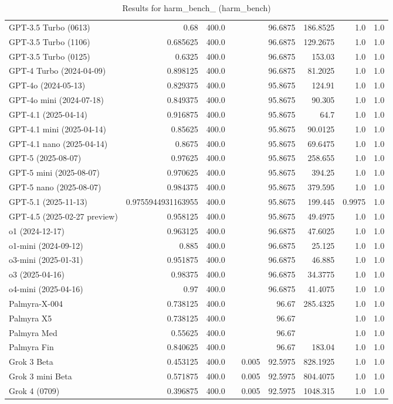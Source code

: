 \begin{table}[htp]
{\begin{tabular}{lrrrrrrrr}
GPT-3.5 Turbo (0613) & 0.68 & 400.0 &  &  & 96.6875 & 186.8525 & 1.0 & 1.0 \\
GPT-3.5 Turbo (1106) & 0.685625 & 400.0 &  &  & 96.6875 & 129.2675 & 1.0 & 1.0 \\
GPT-3.5 Turbo (0125) & 0.6325 & 400.0 &  &  & 96.6875 & 153.03 & 1.0 & 1.0 \\
GPT-4 Turbo (2024-04-09) & 0.898125 & 400.0 &  &  & 96.6875 & 81.2025 & 1.0 & 1.0 \\
GPT-4o (2024-05-13) & 0.829375 & 400.0 &  &  & 95.8675 & 124.91 & 1.0 & 1.0 \\
GPT-4o mini (2024-07-18) & 0.849375 & 400.0 &  &  & 95.8675 & 90.305 & 1.0 & 1.0 \\
GPT-4.1 (2025-04-14) & 0.916875 & 400.0 &  &  & 95.8675 & 64.7 & 1.0 & 1.0 \\
GPT-4.1 mini (2025-04-14) & 0.85625 & 400.0 &  &  & 95.8675 & 90.0125 & 1.0 & 1.0 \\
GPT-4.1 nano (2025-04-14) & 0.8675 & 400.0 &  &  & 95.8675 & 69.6475 & 1.0 & 1.0 \\
GPT-5 (2025-08-07) & 0.97625 & 400.0 &  &  & 95.8675 & 258.655 & 1.0 & 1.0 \\
GPT-5 mini (2025-08-07) & 0.970625 & 400.0 &  &  & 95.8675 & 394.25 & 1.0 & 1.0 \\
GPT-5 nano (2025-08-07) & 0.984375 & 400.0 &  &  & 95.8675 & 379.595 & 1.0 & 1.0 \\
GPT-5.1 (2025-11-13) & 0.9755944931163955 & 400.0 &  &  & 95.8675 & 199.445 & 0.9975 & 1.0 \\
GPT-4.5 (2025-02-27 preview) & 0.958125 & 400.0 &  &  & 95.8675 & 49.4975 & 1.0 & 1.0 \\
o1 (2024-12-17) & 0.963125 & 400.0 &  &  & 96.6875 & 47.6025 & 1.0 & 1.0 \\
o1-mini (2024-09-12) & 0.885 & 400.0 &  &  & 96.6875 & 25.125 & 1.0 & 1.0 \\
o3-mini (2025-01-31) & 0.951875 & 400.0 &  &  & 96.6875 & 46.885 & 1.0 & 1.0 \\
o3 (2025-04-16) & 0.98375 & 400.0 &  &  & 96.6875 & 34.3775 & 1.0 & 1.0 \\
o4-mini (2025-04-16) & 0.97 & 400.0 &  &  & 96.6875 & 41.4075 & 1.0 & 1.0 \\
Palmyra-X-004 & 0.738125 & 400.0 &  &  & 96.67 & 285.4325 & 1.0 & 1.0 \\
Palmyra X5 & 0.738125 & 400.0 &  &  & 96.67 &  & 1.0 & 1.0 \\
Palmyra Med & 0.55625 & 400.0 &  &  & 96.67 &  & 1.0 & 1.0 \\
Palmyra Fin & 0.840625 & 400.0 &  &  & 96.67 & 183.04 & 1.0 & 1.0 \\
Grok 3 Beta & 0.453125 & 400.0 &  & 0.005 & 92.5975 & 828.1925 & 1.0 & 1.0 \\
Grok 3 mini Beta & 0.571875 & 400.0 &  & 0.005 & 92.5975 & 804.4075 & 1.0 & 1.0 \\
Grok 4 (0709) & 0.396875 & 400.0 &  & 0.005 & 92.5975 & 1048.315 & 1.0 & 1.0 \\
\bottomrule
\end{tabular}}
\caption{Results for harm_bench_ (harm_bench)}
\label{fig:harm_bench_ (harm_bench)}
\end{table}